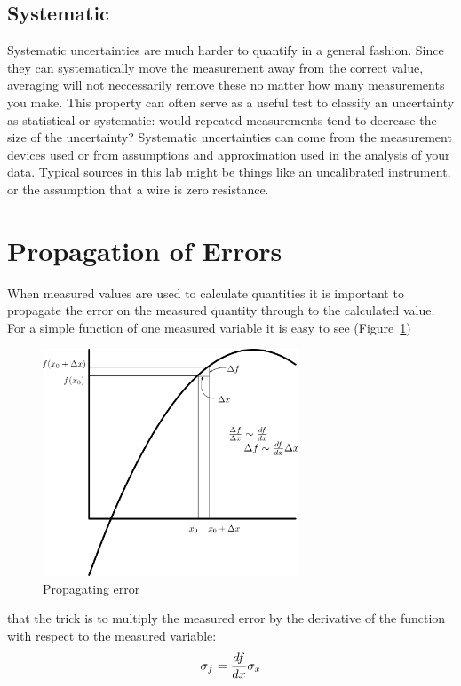 \subsection{Systematic}

Systematic uncertainties are much harder to quantify in a general fashion.  Since they can systematically move the measurement away from the correct value, averaging will not neccessarily remove these no matter how many measurements you make.  This property can often serve as a useful test to classify an uncertainty as statistical or systematic: would repeated measurements tend to decrease the size of the uncertainty?  Systematic uncertainties can come from the measurement devices used or from assumptions and approximation used in the analysis of your data.  Typical sources in this lab might be things like an uncalibrated instrument, or the assumption that a wire is zero resistance.

\section{Propagation of Errors}

When measured values are used to calculate quantities it is important to propagate the error on the measured quantity through to the calculated value.  For a simple function of one measured variable it is easy to see (Figure~\ref{fig:error-prop})
\begin{figure}
\includegraphics[width=3in]{../images/error-prop.png}
\caption{Propagating error}
\label{fig:error-prop}
\end{figure}
that the trick is to multiply the measured error by the derivative of the function with respect to the measured variable:
\begin{equation}
\sigma_f = {df \over dx} \sigma_x
\end{equation}

